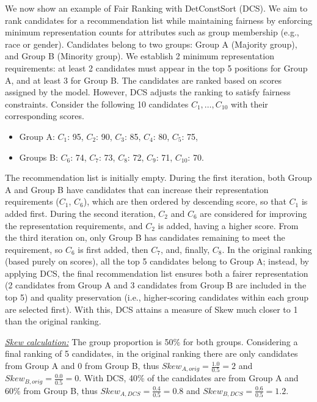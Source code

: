 \begin{example}
    We now show an example of Fair Ranking with DetConstSort (DCS). We aim to rank candidates for a recommendation list while maintaining fairness by enforcing minimum representation counts for attributes such as group membership (e.g., race or gender).  Candidates belong to two groups: Group A (Majority group), and Group B (Minority group). We establish 2 minimum representation requirements: at least 2 candidates must appear in the top 5 positions for Group A, and at least 3 for Group B. The candidates are ranked based on scores assigned by the model. However, DCS adjusts the ranking to satisfy fairness constraints.
    Consider the following 10 candidates $C_1,\ldots,C_{10}$ with their corresponding scores.
    \begin{itemize}
        \item Group A: $C_1$: 95, $C_2$: 90, $C_3$: 85, $C_4$: 80, $C_5$: 75,
        \item Groups B: $C_6$: 74, $C_7$: 73, $C_8$: 72, $C_9$: 71, $C_{10}$: 70.
    \end{itemize}
The recommendation list is initially empty. During the first iteration, both Group A and Group B have candidates that can increase their representation requirements ($C_1$, $C_6$), which are then ordered by descending score, so that $C_1$ is added first. During the second iteration, $C_2$ and $C_6$ are considered for improving the representation requirements, and $C_2$ is added, having a higher score. From the third iteration on, only Group B has candidates remaining to meet the requirement, so $C_6$ is first added, then $C_7$, and, finally, $C_8$. In the original ranking (based purely on scores), all the top 5 candidates belong to Group A; instead, by applying DCS, the final recommendation list ensures both a fairer representation (2 candidates from Group A and 3 candidates from Group B are included in the top 5) and quality preservation (i.e., higher-scoring candidates within each group are selected first).
With this, DCS attains a measure of Skew
much closer to 1 than the original ranking.

\noindent\emph{\underline{Skew calculation:}} The group proportion is 50\% for both groups. Considering a final ranking of 5 candidates, in the original ranking there are only candidates from Group A and 0 from Group B, thus
$Skew_{A,orig}= \frac{1.0}{0.5}=2$ and $Skew_{B,orig}= \frac{0.0}{0.5}=0$. With DCS, 40\% of the candidates are from Group A and 60\% from Group B, thus $Skew_{A,DCS}= \frac{0.4}{0.5}=0.8$ and $Skew_{B,DCS}= \frac{0.6}{0.5}=1.2$.
   \qedfull
\end{example}


